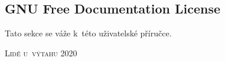 \documentclass[a5paper,8pt,twoside]{extarticle}
\newcommand*\cleartoleftpage{%
  \clearpage
  \ifodd\value{page}\hbox{}\newpage\fi
}
\begin{document}
    \subsection{GNU Free Documentation License}
    Tato sekce se váže k~této uživatelské příručce.

    

    \cleartoleftpage
    \thispagestyle{empty}
    \null
    \vfill
    {\large \textsc{\textcopyright{} Lidé u~výtahu 2020}}
\end{document}
